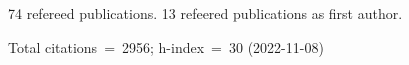 74 refereed publications. 13 refeered publications as first author.

Total citations~=~2956; h-index~=~30 (2022-11-08)